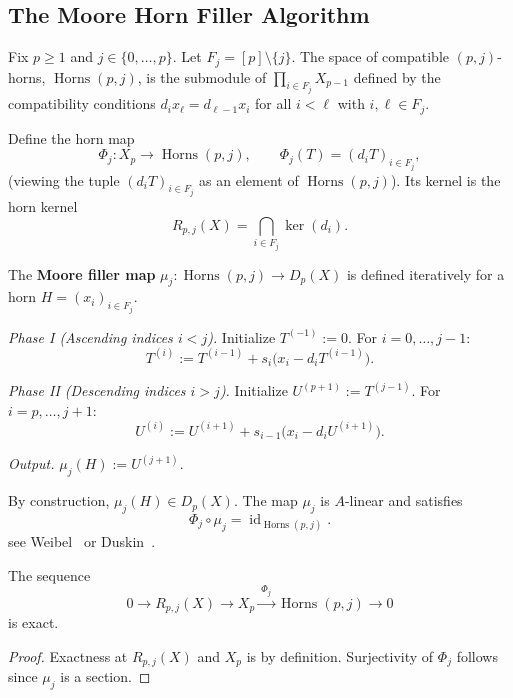 \subsection{The Moore Horn Filler Algorithm}

\begin{definition}
Fix $p\ge 1$ and $j\in\{0,\dots,p\}$. Let $F_j = [p]\setminus\{j\}$. The space of compatible $(p,j)$-horns, $\operatorname{Horns}(p,j)$, is the submodule of $\prod_{i\in F_j}X_{p-1}$ defined by the compatibility conditions $d_i x_\ell = d_{\ell-1} x_i$ for all $i<\ell$ with $i,\ell\in F_j$.
\end{definition}

Define the horn map
\[
\Phi_j:X_p\to \operatorname{Horns}(p,j),\qquad \Phi_j(T)=(d_iT)_{i\in F_j},
\]
(viewing the tuple $(d_iT)_{i\in F_j}$ as an element of $\operatorname{Horns}(p,j)$). Its kernel is the horn kernel
\[
R_{p,j}(X)=\bigcap_{i\in F_j}\ker(d_i).
\]


\begin{definition}\label{def:moore_filler}
The \textbf{Moore filler map} $\mu_j: \operatorname{Horns}(p,j) \to D_p(X)$ is defined iteratively for a horn $H=(x_i)_{i\in F_j}$.

\emph{Phase I (Ascending indices $i<j$).} Initialize $T^{(-1)} := 0$. For $i=0,\dots,j-1$:
\[
T^{(i)} := T^{(i-1)} + s_i\bigl(x_i - d_i T^{(i-1)}\bigr).
\]

\emph{Phase II (Descending indices $i>j$).} Initialize $U^{(p+1)} := T^{(j-1)}$. For $i=p,\dots,j+1$:
\[
U^{(i)} := U^{(i+1)} + s_{i-1}\bigl(x_i - d_i U^{(i+1)}\bigr).
\]

\emph{Output.} $\mu_j(H) := U^{(j+1)}$.
\end{definition}

By construction, $\mu_j(H) \in D_p(X)$. The map $\mu_j$ is $A$-linear and satisfies
\[
\Phi_j\circ\mu_j=\operatorname{id}_{\operatorname{Horns}(p,j)}.
\]
see Weibel~\cite[Lemma~8.2.6]{Weibel} or Duskin~\cite[Lemma 3.1]{Duskin1979}.


\begin{proposition}\label{prop:3term}
The sequence
\[
0\longrightarrow R_{p,j}(X) \longrightarrow X_p \xrightarrow{\ \Phi_j\ } \operatorname{Horns}(p,j) \longrightarrow 0
\]
is exact. 
\end{proposition}

\begin{proof}
Exactness at $R_{p,j}(X)$ and $X_p$ is by definition.
Surjectivity of $\Phi_j$ follows since  $\mu_j$ is a section.
\end{proof}




